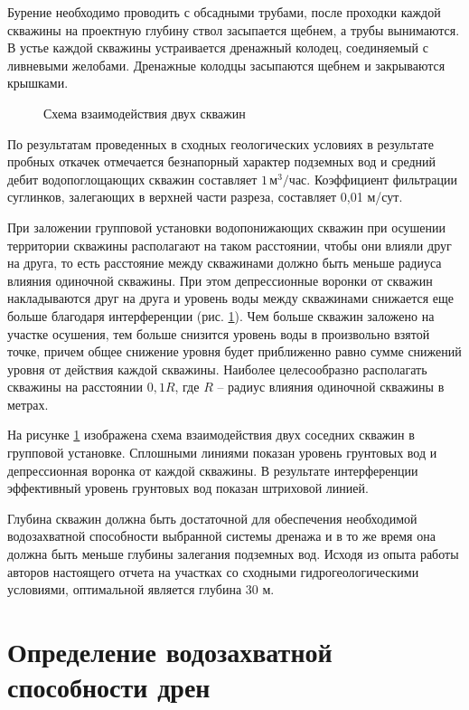 \documentclass[a4paper,12pt]{article} %
\begin{document}
Бурение необходимо проводить с обсадными трубами, после проходки каждой скважины на проектную глубину ствол засыпается щебнем, а трубы вынимаются. 
В устье каждой скважины устраивается дренажный колодец, соединяемый с ливневыми желобами. Дренажные колодцы засыпаются щебнем и закрываются крышками.

\begin{figure}[!h]
	\centering
	\caption{Схема взаимодействия двух скважин}
	\label{img:scheme2}
\end{figure}

По результатам проведенных в сходных геологических условиях в результате пробных откачек отмечается безнапорный характер подземных вод и средний дебит водопоглощающих скважин составляет $1 \, м^3/час$. Коэффициент фильтрации суглинков, залегающих в верхней части разреза, составляет 0,01 м/сут. 

При заложении групповой установки водопонижающих скважин при осушении территории скважины располагают на таком расстоянии, чтобы они влияли друг на друга, то есть расстояние между скважинами должно быть меньше радиуса влияния одиночной скважины. При этом депрессионные воронки от скважин накладываются друг на друга  и уровень воды между скважинами снижается еще больше благодаря интерференции (рис. \ref{img:scheme2}). Чем больше скважин заложено на участке осушения, тем больше снизится уровень воды в произвольно взятой точке, причем общее снижение уровня будет приближенно равно сумме снижений уровня от действия каждой скважины. Наиболее целесообразно располагать скважины на расстоянии  $0,1R$, где $R$ – радиус влияния одиночной скважины в метрах. 

На рисунке \ref{img:scheme2} изображена схема взаимодействия двух соседних скважин в групповой установке. Сплошными линиями показан уровень грунтовых вод и депрессионная воронка от каждой скважины. В результате интерференции эффективный уровень грунтовых вод показан штриховой линией. 

Глубина скважин должна быть достаточной для обеспечения необходимой водозахватной способности выбранной системы дренажа и в то же время она должна быть меньше глубины залегания подземных вод. Исходя из опыта работы авторов настоящего отчета на участках со сходными гидрогеологическими условиями, оптимальной является глубина 30 м.


\section{Определение водозахватной способности дрен}
\end{document}
